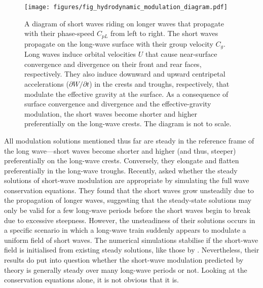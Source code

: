 \documentclass[lineno]{jfm}
\begin{document}
\begin{figure}
\centering
\texttt{[image: figures/fig\_hydrodynamic\_modulation\_diagram.pdf]}
\caption{
  A diagram of short waves riding on longer waves that propagate with their
  phase-speed $C_{pL}$ from left to right.
  The short waves propagate on the long-wave surface with their group velocity
  $C_g$.
  Long waves induce orbital velocities $U$ that cause near-surface convergence
  and divergence on their front and rear faces, respectively.
  They also induce downward and upward centripetal accelerations
  ($\partial W/\partial t$) in the crests and troughs, respectively, that
  modulate the effective gravity at the surface.
  As a consequence of surface convergence and divergence and the effective-gravity
  modulation, the short waves become shorter and higher preferentially
  on the long-wave crests.
  The diagram is not to scale.
}
\label{fig:hydrodynamic_modulation_diagram}
\end{figure}

All modulation solutions mentioned thus far are steady in the reference frame
of the long wave---short waves become shorter and higher (and thus, steeper)
preferentially on the long-wave crests.
Conversely, they elongate and flatten preferentially in the long-wave troughs.
Recently, \citet{peureux2021unsteady} asked whether the steady solutions
of short-wave modulation are appropriate by simulating the full wave conservation
equations.
They found that the short waves grow unsteadily due to the propagation of
longer waves, suggesting that the steady-state solutions may only be valid for
a few long-wave periods before the short waves begin to break due to excessive
steepness.
However, the unsteadiness of their solutions occurs in a specific scenario in
which a long-wave train suddenly appears to modulate a uniform field of short
waves.
The numerical simulations stabilise if the short-wave field is initialised
from existing steady solutions, like those by \citet{longuet1960changes}.
Nevertheless, their results do put into question whether the short-wave
modulation predicted by theory is generally steady over many long-wave periods
or not.
Looking at the conservation equations alone, it is not obvious that it is.
\end{document}
